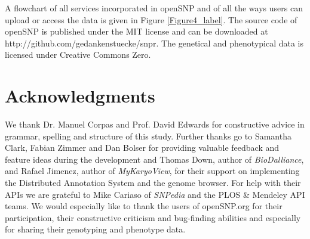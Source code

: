 \documentclass[10pt]{article}
\begin{document}
A flowchart of all services incorporated in openSNP and of all the ways users can upload or access the data is given in Figure \ref{Figure4_label}. The source code of openSNP is 
published under the MIT license and can be downloaded at http://github.com/gedankenstuecke/snpr. The genetical and phenotypical data is licensed under Creative Commons Zero. 
\section*{Acknowledgments}
We thank Dr. Manuel Corpas and Prof. David Edwards for constructive advice in grammar, spelling and structure of this study. Further thanks go to Samantha Clark, Fabian Zimmer and Dan Bolser for providing valuable feedback and feature ideas during the development and Thomas Down, author of \emph{BioDalliance}, and Rafael Jimenez, author of \emph{MyKaryoView}, for their support on implementing the Distributed Annotation System and the genome browser. For help with their APIs we are grateful to Mike Cariaso of \emph{SNPedia} and the PLOS \& Mendeley API teams. We would especially like to thank the users of openSNP.org for their participation, their constructive criticism and bug-finding abilities and especially for sharing their genotyping and phenotype data.


\end{document}

